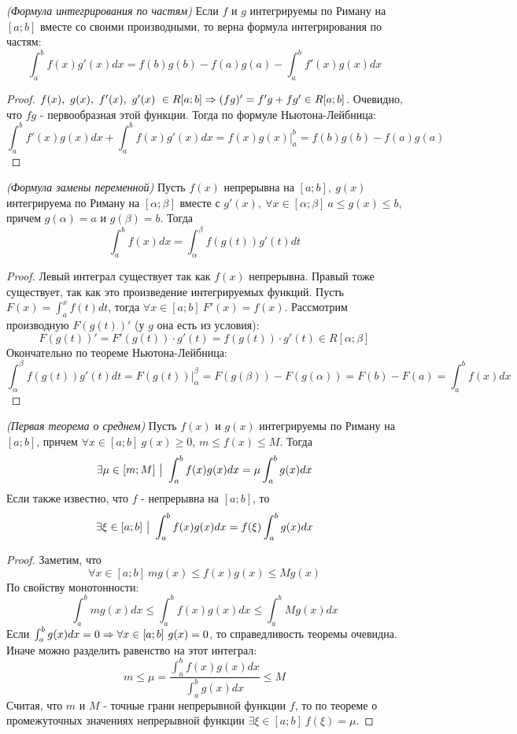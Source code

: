 \begin{corollary} \textit{(Формула интегрирования по частям)}
	Если $f$ и $g$ интегрируемы по Риману на $[a;b]$ вместе со своими производными, то верна формула интегрирования по частям:
	\[
		\int_a^bf(x)g'(x)dx = f(b)g(b) - f(a)g(a) - \int_a^bf'(x)g(x)dx
	\]
\end{corollary}

\begin{proof}
	$\\ f(x),\ g(x),\ f'(x),\ g'(x)\ \in R[a;b] \Ra (fg)'= f'g + fg' \in R[a;b]$.
	Очевидно, что $fg$ - первообразная этой функции. Тогда по формуле Ньютона-Лейбница:
	\[
		\int_a^bf'(x)g(x)dx + \int_a^bf(x)g'(x)dx = f(x)g(x)\Bigg |^b_a = f(b)g(b) - f(a)g(a)
	\]
\end{proof}

\begin{theorem} \textit{(Формула замены переменной)}
	Пусть $f(x)$ непрерывна на $[a;b],\ g(x)$ интегрируема по Риману на $[\alpha; \beta]$ вместе с $g'(x),\ \forall x \in [\alpha; \beta]\ a \leq g(x) \leq b$, причем $g(\alpha) = a\text{ и } g(\beta) = b$. Тогда 
	\[
		\int_a^bf(x)dx = \int_\alpha^\beta f(g(t))g'(t)dt
	\]
\end{theorem}

\begin{proof}
	Левый интеграл существует так как $f(x)$ непрерывна. Правый тоже существует, так как это произведение интегрируемых функций.
	Пусть $F(x) = \int_a^xf(t)dt$, тогда $\forall x \in [a;b]\ F'(x) = f(x)$.
	Рассмотрим производную $F(g(t))'$ (у $g$ она есть из условия):
	\[
		F(g(t))' = F'(g(t))\cdot g'(t) = f(g(t))\cdot g'(t) \in R[\alpha;\beta]
	\]
	Окончательно по теореме Ньютона-Лейбница:
	\[
		\int_\alpha^\beta f(g(t))g'(t)dt = F(g(t)) \Biggr |_\alpha^\beta = F(g(\beta)) - F(g(\alpha))= F(b) - F(a) = \int_a^bf(x)dx
	\]
\end{proof}

\begin{theorem} \textit{(Первая теорема о среднем)}
	Пусть $f(x)$ и $g(x)$ интегрируемы по Риману на $[a;b]$, причем $\forall x \in [a;b]\ g(x) \geq 0$, $m \leq f(x) \leq M$. Тогда 
	\[
		\exists \mu \in [m;M] \ \big|\  \int_a^bf(x)g(x)dx = \mu \int_a^bg(x)dx
	\]
	Если также известно, что $f$ - непрерывна на $[a;b]$, то 
	\[
		\exists \xi \in [a;b]\ \big|\  \int_a^bf(x)g(x)dx = f(\xi)\int_a^bg(x)dx
	\]
\end{theorem}

\begin{proof}
	Заметим, что
	\[
		\forall x\in [a;b]\ mg(x) \leq f(x)g(x) \leq Mg(x)
	\]
	По свойству монотонности:
	\[
		\int_a^b mg(x)dx \leq \int_a^b f(x)g(x)dx \leq \int_a^b Mg(x)dx
	\]
	Если $\int_a^bg(x)dx = 0 \Rightarrow \forall x \in [a;b]\ g(x) = 0$, то справедливость теоремы очевидна.
	Иначе можно разделить равенство на этот интеграл:
	\[
		m \leq \mu = \frac{\int_a^b f(x)g(x)dx}{\int_a^b g(x)dx} \leq M
	\]
	Считая, что $m$ и $M$ - точные грани непрерывной функции $f$, то по теореме о промежуточных значениях непрерывной функции $\exists \xi \in [a;b]\ f(\xi) = \mu$.
\end{proof}

